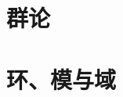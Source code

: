 \documentclass[12pt, a4paper, openany]{book}
\begin{document}
\part{群论}





\part{环、模与域}






\appendix




\printindex
\end{document}
